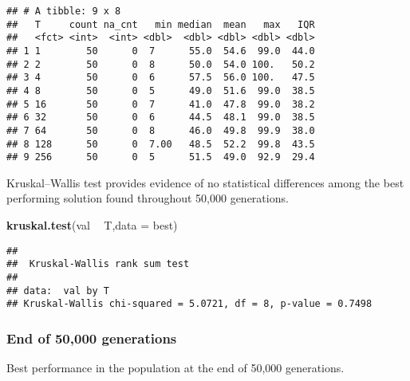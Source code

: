 \documentclass[]{book}
\newenvironment{Shaded}{\begin{snugshade}}{\end{snugshade}}
\newcommand{\DataTypeTok}[1]{\textcolor[rgb]{0.13,0.29,0.53}{#1}}
\newcommand{\KeywordTok}[1]{\textcolor[rgb]{0.13,0.29,0.53}{\textbf{#1}}}
\newcommand{\NormalTok}[1]{#1}
\newcommand{\OperatorTok}[1]{\textcolor[rgb]{0.81,0.36,0.00}{\textbf{#1}}}
\newcommand{\StringTok}[1]{\textcolor[rgb]{0.31,0.60,0.02}{#1}}
\begin{document}
\begin{verbatim}
## # A tibble: 9 x 8
##   T     count na_cnt   min median  mean   max   IQR
##   <fct> <int>  <int> <dbl>  <dbl> <dbl> <dbl> <dbl>
## 1 1        50      0  7      55.0  54.6  99.0  44.0
## 2 2        50      0  8      50.0  54.0 100.   50.2
## 3 4        50      0  6      57.5  56.0 100.   47.5
## 4 8        50      0  5      49.0  51.6  99.0  38.5
## 5 16       50      0  7      41.0  47.8  99.0  38.2
## 6 32       50      0  6      44.5  48.1  99.0  38.5
## 7 64       50      0  8      46.0  49.8  99.9  38.0
## 8 128      50      0  7.00   48.5  52.2  99.8  43.5
## 9 256      50      0  5      51.5  49.0  92.9  29.4
\end{verbatim}

Kruskal--Wallis test provides evidence of no statistical differences among the best performing solution found throughout 50,000 generations.

\begin{Shaded}
\begin{Highlighting}[]
\KeywordTok{kruskal.test}\NormalTok{(val }\OperatorTok{~}\StringTok{ }\NormalTok{T,}\DataTypeTok{data =}\NormalTok{ best)}
\end{Highlighting}
\end{Shaded}

\begin{verbatim}
## 
##  Kruskal-Wallis rank sum test
## 
## data:  val by T
## Kruskal-Wallis chi-squared = 5.0721, df = 8, p-value = 0.7498
\end{verbatim}

\hypertarget{end-of-50000-generations-8}{%
\subsubsection{End of 50,000 generations}\label{end-of-50000-generations-8}}

Best performance in the population at the end of 50,000 generations.
\end{document}
